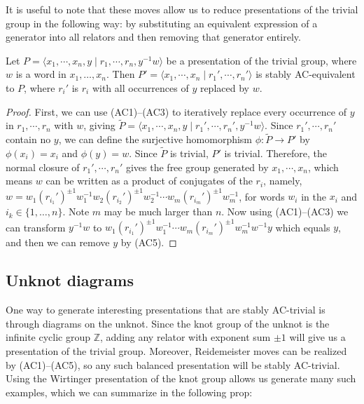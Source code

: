 It is useful to note that these moves allow us to reduce presentations of the trivial group in the following way: by substituting an equivalent expression of a generator into all relators and then removing that generator entirely.
\begin{lemma}[Substitution]
    \label{lem:substitution}
    Let $P=\langle x_1,\cdots, x_n, y \mid r_1,\cdots, r_n, y^{-1}w\rangle$ be a presentation of the trivial group, where $w$ is a word in $x_1,\ldots,x_n$. Then $P'=\langle x_1,\cdots, x_n \mid r_1',\cdots, r_n'\rangle$ is stably AC-equivalent to $P$, where $r_i'$ is $r_i$ with all occurrences of $y$ replaced by $w$.
\end{lemma}
\begin{proof}
    First, we can use (AC1)–(AC3) to iteratively replace every occurrence of $y$ in $r_1,\cdots,r_n$ with $w$, giving $\widetilde{P}=\langle x_1,\cdots,x_n,y\mid r_1',\cdots,r_n',y^{-1}w\rangle$. Since $r_1',\cdots,r_n'$ contain no $y$, we can define the surjective homomorphism $\phi:\widetilde{P}\longrightarrow P'$ by $\phi(x_i)=x_i$ and $\phi(y)=w$. Since $\widetilde{P}$ is trivial, $P'$ is trivial. Therefore, the normal closure of $r_1',\cdots, r_n'$ gives the free group generated by $x_1,\cdots, x_n$, which means $w$ can be written as a product of conjugates of the $r_i$, namely, $w=w_1 (r_{i_1}')^{\pm1}w_1^{-1}w_2 (r_{i_2}')^{\pm 1}w_2^{-1}\cdots w_m (r_{i_m}')^{\pm 1}w_m^{-1}$, for words $w_i$ in the $x_i$ and $i_k \in \{1,\ldots,n\}$. Note $m$ may be much larger than $n$. Now using (AC1)–(AC3) we can transform  $y^{-1}w$ to $w_1 (r_{i_1}')^{\pm1}w_1^{-1}\cdots w_m (r_{i_m}')^{\pm 1}w_m^{-1}w^{-1}y$ which equals $y$, and then we can remove $y$ by (AC5).
\end{proof}

\subsection{Unknot diagrams}

One way to generate interesting presentations that are stably AC-trivial is through diagrams on the unknot. Since the knot group of the unknot is the infinite cyclic group $\mathbb{Z}$, adding any relator with exponent sum $\pm 1$ will give us a presentation of the trivial group. Moreover, Reidemeister moves can be realized by (AC1)–(AC5), so any such balanced presentation will be stably AC-trivial. Using the Wirtinger presentation of the knot group allows us generate many such examples, which we can summarize in the following prop:

